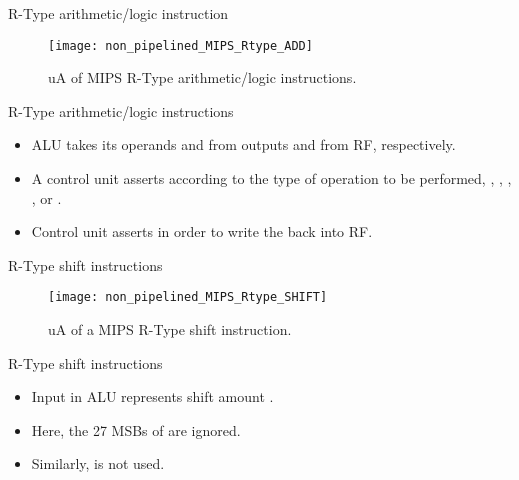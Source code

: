 % 
\begin{frame}{R-Type arithmetic/logic instruction}
  \begin{figure}
  \centering
  \texttt{[image: non\_pipelined\_MIPS\_Rtype\_ADD]}
  \vspace{-1pt}
  \caption{\ac{uA} of \ac{MIPS} R-Type arithmetic/logic instructions.}
  \label{Figure:non_pipelined_MIPS_Rtype_ADD}
  \end{figure}
\end{frame}

% 
\begin{frame}{R-Type arithmetic/logic instructions}
\begin{itemize}
\item \ac{ALU} takes its operands  and  from outputs  and  from \ac{RF}, respectively.
\item A control unit asserts  according to the type of operation to be performed, \ie, , , ,  or . 
\item Control unit asserts  in order to write the  back into \ac{RF}.
\end{itemize}
\end{frame}


% 
\begin{frame}{R-Type shift instructions}
  \begin{figure}
  \centering
  \texttt{[image: non\_pipelined\_MIPS\_Rtype\_SHIFT]}
  \vspace{-3pt}
  \caption{\ac{uA} of a \ac{MIPS} R-Type shift instruction.}
  \label{Figure:non_pipelined_MIPS_Rtype_SHIFT}
  \end{figure}
\end{frame}


% 
\begin{frame}{R-Type shift instructions}
\begin{itemize}
\item Input  in \ac{ALU} represents shift amount .
\item Here, the 27 \acp{MSB} of  are ignored.
\item Similarly,  is not used.
\end{itemize}
\end{frame}

